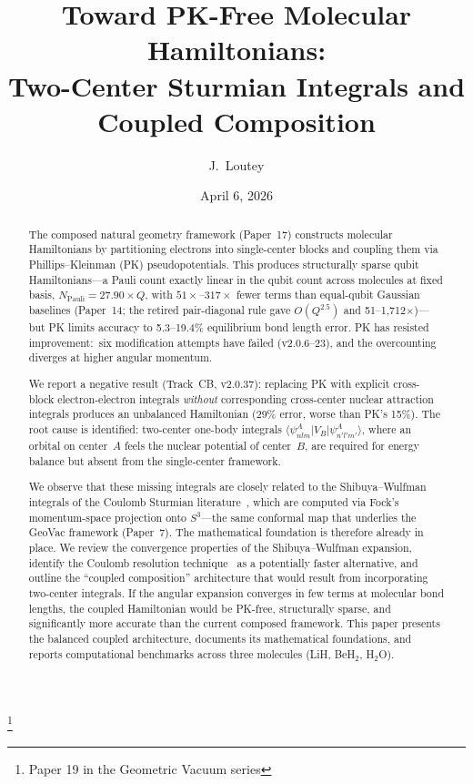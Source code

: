 \documentclass[aps,pra,twocolumn,superscriptaddress,longbibliography]{revtex4-2}
\begin{document}
\title{Toward PK-Free Molecular Hamiltonians:\\
Two-Center Sturmian Integrals and Coupled Composition}
\thanks{Paper 19 in the Geometric Vacuum series}

\author{J.~Loutey}

\date{April 6, 2026}


\begin{abstract}
The composed natural geometry framework (Paper~17) constructs
molecular Hamiltonians by partitioning electrons into single-center
blocks and coupling them via Phillips--Kleinman (PK) pseudopotentials.
This produces structurally sparse qubit Hamiltonians---a Pauli count
exactly linear in the qubit count across molecules at fixed basis,
$N_{\mathrm{Pauli}} = 27.90 \times Q$, with $51\times$--$317\times$
fewer terms than equal-qubit Gaussian baselines (Paper~14; the
retired pair-diagonal rule gave $O(Q^{2.5})$ and
51--1{,}712$\times$)---but PK limits accuracy to 5.3--19.4\%
equilibrium bond length error.  PK has resisted improvement:\ six
modification attempts have failed (v2.0.6--23), and the overcounting
diverges at higher angular momentum.

We report a negative result (Track~CB, v2.0.37): replacing PK with
explicit cross-block electron-electron integrals \emph{without}
corresponding cross-center nuclear attraction integrals produces an
unbalanced Hamiltonian (29\% error, worse than PK's 15\%).  The root
cause is identified: two-center one-body integrals
$\langle \psi_{nlm}^A | V_B | \psi_{n'l'm'}^A \rangle$, where an
orbital on center~$A$ feels the nuclear potential of center~$B$, are
required for energy balance but absent from the single-center
framework.

We observe that these missing integrals are closely related to the
Shibuya--Wulfman integrals of the Coulomb Sturmian
literature~\cite{shibuya1965,avery2004,avery2012}, which are computed
via Fock's momentum-space projection onto $S^3$---the same conformal
map that underlies the GeoVac framework (Paper~7).  The mathematical
foundation is therefore already in place.  We review the convergence
properties of the Shibuya--Wulfman expansion, identify the Coulomb
resolution technique~\cite{hoggan2011} as a potentially faster
alternative, and outline the ``coupled composition'' architecture
that would result from incorporating two-center integrals.  If the
angular expansion converges in few terms at molecular bond lengths,
the coupled Hamiltonian would be PK-free, structurally sparse, and
significantly more accurate than the current composed framework.
This paper presents the balanced coupled architecture, documents its mathematical foundations, and reports computational benchmarks across three molecules (LiH, BeH$_2$, H$_2$O).


\end{abstract}
\end{document}
